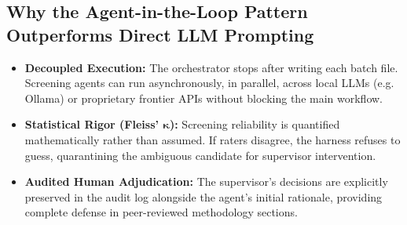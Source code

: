 \documentclass[10pt,a4paper]{article}
\begin{document}
\begin{center}
\end{center}
\vspace{-4pt}

\subsection{Why the Agent-in-the-Loop Pattern Outperforms Direct LLM Prompting}

\begin{itemize}[leftmargin=1.4em, itemsep=1.5pt, topsep=1pt]
    \item \textbf{Decoupled Execution:} The orchestrator stops after writing each batch file. Screening agents can run asynchronously, in parallel, across local LLMs (e.g. Ollama) or proprietary frontier APIs without blocking the main workflow.
    \item \textbf{Statistical Rigor (Fleiss' $\boldsymbol{\kappa}$):} Screening reliability is quantified mathematically rather than assumed. If raters disagree, the harness refuses to guess, quarantining the ambiguous candidate for supervisor intervention.
    \item \textbf{Audited Human Adjudication:} The supervisor's decisions are explicitly preserved in the audit log alongside the agent's initial rationale, providing complete defense in peer-reviewed methodology sections.
\end{itemize}

\end{document}
